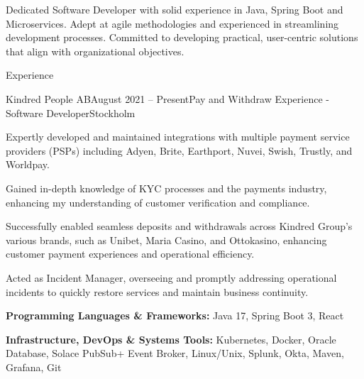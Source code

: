 \documentclass{resume}
\begin{document}
  \noindent
  \linebreak
  Dedicated Software Developer with solid experience in Java, Spring Boot and Microservices. Adept at agile methodologies and experienced in streamlining development processes. Committed to developing practical, user-centric solutions that align with organizational objectives.

  \begin{rSection}{Experience}
    \begin{rSubsection}{Kindred People AB}{August 2021 -- Present}{Pay and Withdraw Experience - Software Developer}{Stockholm}
      \item Expertly developed and maintained integrations with multiple payment service providers (PSPs) including Adyen, Brite, Earthport, Nuvei, Swish, Trustly, and Worldpay.
      \item Gained in-depth knowledge of KYC processes and the payments industry, enhancing my understanding of customer verification and compliance.
      \item Successfully enabled seamless deposits and withdrawals across Kindred Group's various brands, such as Unibet, Maria Casino, and Ottokasino, enhancing customer payment experiences and operational efficiency.
      \item Acted as Incident Manager, overseeing and promptly addressing operational incidents to quickly restore services and maintain business continuity.
      \item \textbf{Programming Languages \& Frameworks:} Java 17, Spring Boot 3, React
      \item \textbf{Infrastructure, DevOps \& Systems Tools:} Kubernetes, Docker, Oracle Database, Solace PubSub+ Event Broker, Linux/Unix, Splunk, Okta, Maven, Grafana, Git
   \end{rSubsection}


\end{rSection}
\end{document}

